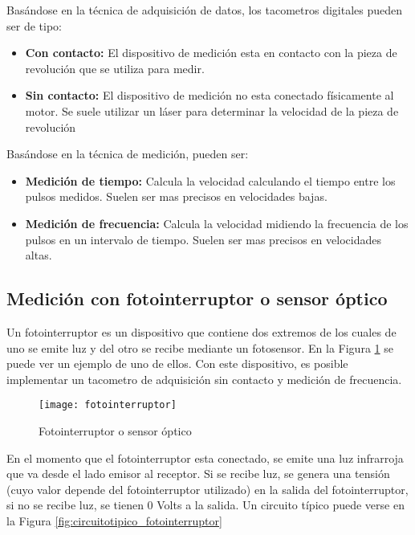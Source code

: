 Basándose en la técnica de adquisición de datos, los tacometros digitales pueden ser de tipo:

\begin{itemize}
  \item \textbf{Con contacto:} El dispositivo de medición esta en contacto con la pieza de revolución que se utiliza para medir. 
  \item \textbf{Sin contacto:} El dispositivo de medición no esta conectado físicamente al motor. Se suele utilizar un láser para determinar la velocidad de la pieza de revolución
\end{itemize}

Basándose en la técnica de medición, pueden ser:

\begin{itemize}
  \item \textbf{Medición de tiempo:} Calcula la velocidad calculando el tiempo entre los pulsos medidos. Suelen ser mas precisos en velocidades bajas.
  \item \textbf{Medición de frecuencia:} Calcula la velocidad midiendo la frecuencia de los pulsos en un intervalo de tiempo. Suelen ser mas precisos en velocidades altas.
\end{itemize}

\subsection{Medición con fotointerruptor o sensor óptico} %
\label{sub:medicion_con_fotointerruptor_o_sensor_optico}

Un fotointerruptor es un dispositivo que contiene dos extremos de los cuales de uno se emite luz y del otro se recibe mediante un fotosensor. En la Figura \ref{fig:fotointerruptor} se puede ver un ejemplo de uno de ellos. Con este dispositivo, es posible implementar un tacometro de adquisición sin contacto y medición de frecuencia.\cite{slotted_sensor}

\begin{figure}[h]
  \centering
  \texttt{[image: fotointerruptor]}
  \caption{Fotointerruptor o sensor óptico}\label{fig:fotointerruptor}
\end{figure}

En el momento que el fotointerruptor esta conectado, se emite una luz infrarroja que va desde el lado emisor al receptor. Si se recibe luz, se genera una tensión (cuyo valor depende del fotointerruptor utilizado) en la salida del fotointerruptor, si no se recibe luz, se tienen 0 Volts a la salida. Un circuito típico puede verse en la Figura \ref{fig:circuitotipico_fotointerruptor} \\

